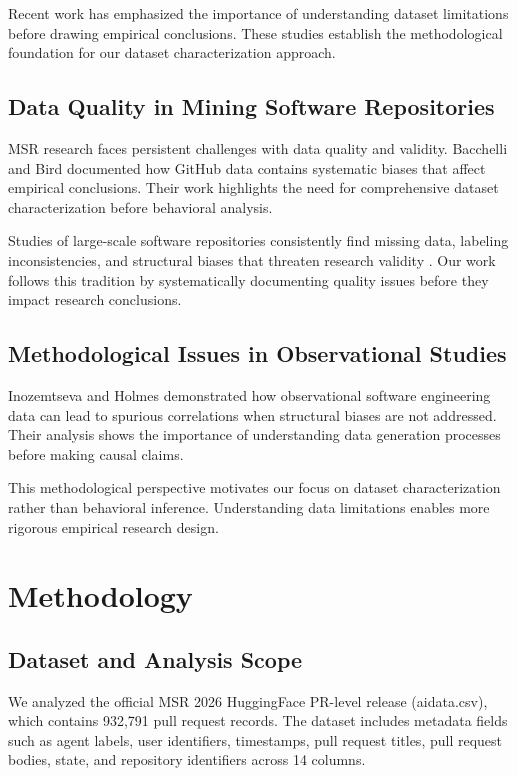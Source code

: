 \documentclass[conference]{IEEEtran}
\begin{document}
Recent work has emphasized the importance of understanding dataset limitations before drawing empirical conclusions. These studies establish the methodological foundation for our dataset characterization approach.

\subsection{Data Quality in Mining Software Repositories}

MSR research faces persistent challenges with data quality and validity. Bacchelli and Bird \cite{bacchelli2013expectations} documented how GitHub data contains systematic biases that affect empirical conclusions. Their work highlights the need for comprehensive dataset characterization before behavioral analysis.

Studies of large-scale software repositories consistently find missing data, labeling inconsistencies, and structural biases that threaten research validity \cite{niu2022role}. Our work follows this tradition by systematically documenting quality issues before they impact research conclusions.

\subsection{Methodological Issues in Observational Studies}

Inozemtseva and Holmes \cite{inozemtseva2014coverage} demonstrated how observational software engineering data can lead to spurious correlations when structural biases are not addressed. Their analysis shows the importance of understanding data generation processes before making causal claims.

This methodological perspective motivates our focus on dataset characterization rather than behavioral inference. Understanding data limitations enables more rigorous empirical research design.

\section{Methodology}

\subsection{Dataset and Analysis Scope}

We analyzed the official MSR 2026 HuggingFace PR-level release (aidata.csv), which contains 932,791 pull request records. The dataset includes metadata fields such as agent labels, user identifiers, timestamps, pull request titles, pull request bodies, state, and repository identifiers across 14 columns.
\end{document}
